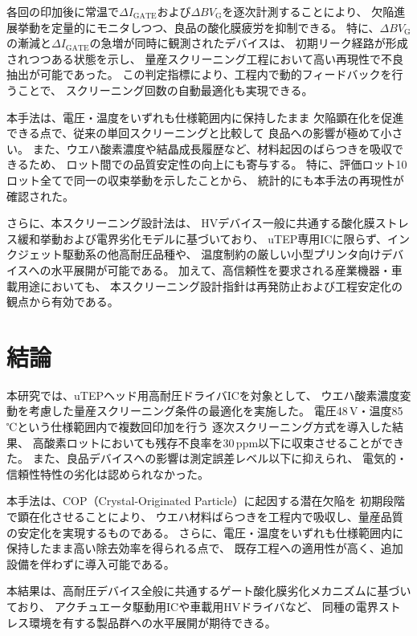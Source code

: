 \documentclass[twocolumn]{ieeetran}
\begin{document}
各回の印加後に常温で$\Delta I_\mathrm{GATE}$および$\Delta BV_\mathrm{G}$を逐次計測することにより、
欠陥進展挙動を定量的にモニタしつつ、良品の酸化膜疲労を抑制できる。
特に、$\Delta BV_\mathrm{G}$の漸減と$\Delta I_\mathrm{GATE}$の急増が同時に観測されたデバイスは、
初期リーク経路が形成されつつある状態を示し、
量産スクリーニング工程において高い再現性で不良抽出が可能であった。
この判定指標により、工程内で動的フィードバックを行うことで、
スクリーニング回数の自動最適化も実現できる。

本手法は、電圧・温度をいずれも仕様範囲内に保持したまま
欠陥顕在化を促進できる点で、従来の単回スクリーニングと比較して
良品への影響が極めて小さい。
また、ウエハ酸素濃度や結晶成長履歴など、材料起因のばらつきを吸収できるため、
ロット間での品質安定性の向上にも寄与する。
特に、評価ロット10ロット全てで同一の収束挙動を示したことから、
統計的にも本手法の再現性が確認された。

さらに、本スクリーニング設計法は、
HVデバイス一般に共通する酸化膜ストレス緩和挙動および電界劣化モデルに基づいており、
uTEP専用ICに限らず、インクジェット駆動系の他高耐圧品種や、
温度制約の厳しい小型プリンタ向けデバイスへの水平展開が可能である。
加えて、高信頼性を要求される産業機器・車載用途においても、
本スクリーニング設計指針は再発防止および工程安定化の観点から有効である。

\section{結論}

本研究では、uTEPヘッド用高耐圧ドライバICを対象として、
ウエハ酸素濃度変動を考慮した量産スクリーニング条件の最適化を実施した。
電圧48\,V・温度85\,℃という仕様範囲内で複数回印加を行う
逐次スクリーニング方式を導入した結果、
高酸素ロットにおいても残存不良率を30\,ppm以下に収束させることができた。
また、良品デバイスへの影響は測定誤差レベル以下に抑えられ、
電気的・信頼性特性の劣化は認められなかった。

本手法は、COP（Crystal-Originated Particle）に起因する潜在欠陥を
初期段階で顕在化させることにより、
ウエハ材料ばらつきを工程内で吸収し、量産品質の安定化を実現するものである。
さらに、電圧・温度をいずれも仕様範囲内に保持したまま高い除去効率を得られる点で、
既存工程への適用性が高く、追加設備を伴わずに導入可能である。

本結果は、高耐圧デバイス全般に共通するゲート酸化膜劣化メカニズムに基づいており、
アクチュエータ駆動用ICや車載用HVドライバなど、
同種の電界ストレス環境を有する製品群への水平展開が期待できる。
\end{document}
